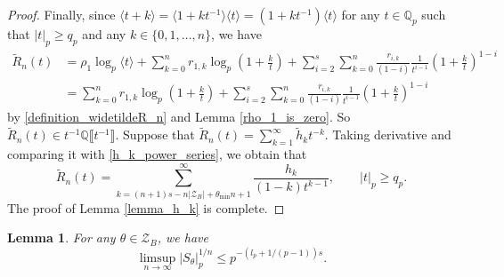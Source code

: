 \documentclass[12pt]{article}
\newtheorem{lemma}[theorem]{Lemma}
\numberwithin{equation}{section}
\begin{document}
\begin{proof}
Finally, since $\langle t+k \rangle = \langle 1+kt^{-1} \rangle\langle t \rangle = (1+kt^{-1})\langle t \rangle$ for any $t \in \mathbb{Q}_p$ such that $|t|_p \geqslant q_p$ and any $k \in \{0,1,\ldots,n\}$, we have
\begin{align*}
	\widetilde{R}_n(t) &= \rho_1 \log_p\langle t \rangle + \sum_{k=0}^{n} r_{1,k}\log_p\left(1+\frac{k}{t}\right) + \sum_{i=2}^{s}\sum_{k=0}^{n} \frac{r_{i,k}}{(1-i)}\frac{1}{t^{i-1}}\left(1+\frac{k}{t}\right)^{1-i} \\
 &= \sum_{k=0}^{n} r_{1,k}\log_p\left(1+\frac{k}{t}\right) + \sum_{i=2}^{s}\sum_{k=0}^{n} \frac{r_{i,k}}{(1-i)}\frac{1}{t^{i-1}}\left(1+\frac{k}{t}\right)^{1-i}
\end{align*}
by \eqref{definition_widetildeR_n} and Lemma \ref{rho_1_is_zero}. So $\widetilde{R}_n(t) \in t^{-1}\mathbb{Q}\llbracket t^{-1} \rrbracket$. Suppose that $\widetilde{R}_n(t) = \sum_{k=1}^{\infty} \widetilde{h}_k t^{-k}$. Taking derivative and comparing it with \eqref{h_k_power_series}, we obtain that
\[ \widetilde{R}_n(t) = \sum_{k=(n+1)s-n|\mathcal{Z}_B|+\theta_{\min}n+1}^{\infty} \frac{h_{k}}{(1-k)t^{k-1}}, \qquad |t|_p \geqslant q_p. \]
The proof of Lemma \ref{lemma_h_k} is complete. 
\end{proof}

	
\begin{lemma}\label{lemma_p_adic_norm_S_theta}
For any $\theta \in \mathcal{Z}_B$, we have
\[ \limsup_{n \to \infty} |S_{\theta}|_p^{1/n} \leqslant p^{-(l_p+1/(p-1))s}. \]
\end{lemma}
	
\end{document}

